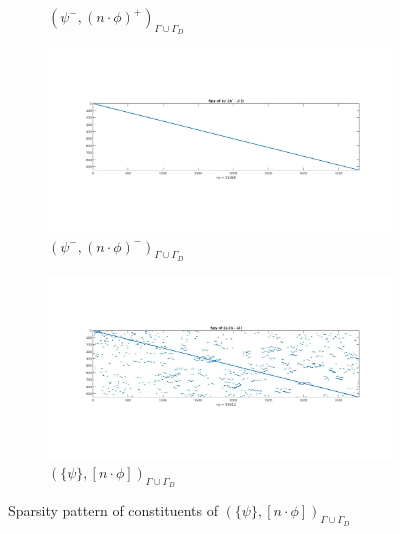 \documentclass[a4paper,openany]{book}
\begin{document}
\begin{figure}
\begin{subfigure}{0.5\textwidth}
  \caption{$( \psi^- ,(n \cdot \phi)^+)_{\Gamma \cup \Gamma_D}$}
  \label{fig:figure43}
  \end{subfigure}
    \begin{subfigure}{0.5\textwidth}
    \includegraphics[width=\linewidth]{figure44.jpg}
  \caption{$( \psi^- ,(n \cdot \phi)^-)_{\Gamma \cup \Gamma_D}$}
  \label{fig:figure44}
  \end{subfigure}
  \begin{subfigure}{\textwidth}	
\centering
  \includegraphics[width=\linewidth]{figure4.jpg}
  \caption{$(\lbrace \psi \rbrace ,[n \cdot \phi])_{\Gamma \cup \Gamma_D}$}
  \label{fig:figure4}
\end{subfigure}
\caption{Sparsity pattern of constituents of $(\lbrace \psi  \rbrace,[n \cdot \phi])_{\Gamma \cup \Gamma_D}$}
\label{figure_4_all}
\end{figure}
\end{document}
